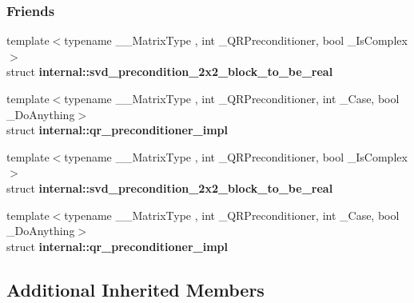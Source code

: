 \subsubsection*{Friends}
\begin{DoxyCompactItemize}
\item 
\mbox{\label{group___s_v_d___module_a88d510b611ce8922ee1457b5a6223658}} 
{\footnotesize template$<$typename \+\_\+\+\_\+\+Matrix\+Type , int \+\_\+\+Q\+R\+Preconditioner, bool \+\_\+\+Is\+Complex$>$ }\\struct {\bfseries internal\+::svd\+\_\+precondition\+\_\+2x2\+\_\+block\+\_\+to\+\_\+be\+\_\+real}
\item 
\mbox{\label{group___s_v_d___module_a1d21ab8e3cfd531f14023c010d3335bc}} 
{\footnotesize template$<$typename \+\_\+\+\_\+\+Matrix\+Type , int \+\_\+\+Q\+R\+Preconditioner, int \+\_\+\+Case, bool \+\_\+\+Do\+Anything$>$ }\\struct {\bfseries internal\+::qr\+\_\+preconditioner\+\_\+impl}
\item 
\mbox{\label{group___s_v_d___module_a2f03d8ec501ba13f69a8936cc8f9c108}} 
{\footnotesize template$<$typename \+\_\+\+\_\+\+Matrix\+Type , int \+\_\+\+Q\+R\+Preconditioner, bool \+\_\+\+Is\+Complex$>$ }\\struct {\bfseries internal\+::svd\+\_\+precondition\+\_\+2x2\+\_\+block\+\_\+to\+\_\+be\+\_\+real}
\item 
\mbox{\label{group___s_v_d___module_a803578ce3302c1a44fd74dede1b4b088}} 
{\footnotesize template$<$typename \+\_\+\+\_\+\+Matrix\+Type , int \+\_\+\+Q\+R\+Preconditioner, int \+\_\+\+Case, bool \+\_\+\+Do\+Anything$>$ }\\struct {\bfseries internal\+::qr\+\_\+preconditioner\+\_\+impl}
\end{DoxyCompactItemize}
\subsection*{Additional Inherited Members}


